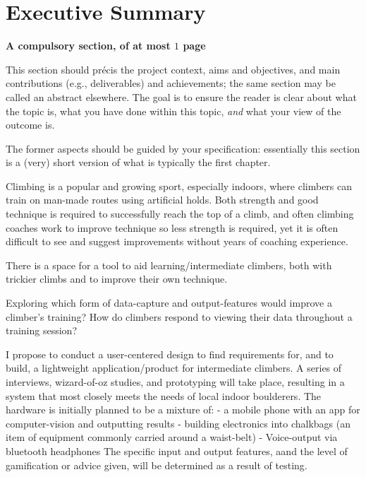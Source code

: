 \chapter*{Executive Summary}

{\bf A compulsory section, of at most $1$ page} 
\vspace{1cm} 

\noindent
This section should pr\'{e}cis the project context, aims and objectives, and main contributions (e.g., deliverables) and achievements; the same section may be called an abstract elsewhere.
The goal is to ensure the reader is clear about what the topic is, what you have done within this topic, {\em and} what your view of the outcome is.

The former aspects should be guided by your specification: essentially this section is a (very) short version of what is typically the first chapter. 



Climbing is a popular and growing sport, especially indoors, where climbers can train on man-made routes using artificial holds.
Both strength and good technique is required to successfully reach the top of a climb, and often climbing coaches work to improve technique so less strength is required, yet it is often difficult to see and suggest improvements without years of coaching experience.

There is a space for a tool to aid learning/intermediate climbers, both with trickier climbs and to improve their own technique.


Exploring which form of data-capture and output-features would improve a climber's training?
How do climbers respond to viewing their data throughout a training session?

I propose to conduct a user-centered design to find requirements for, and to build, a lightweight application/product for intermediate climbers. A series of interviews, wizard-of-oz studies, and prototyping will take place, resulting in a system that most closely meets the needs of local indoor boulderers. The hardware is initially planned to be a mixture of: - a mobile phone with an app for computer-vision and outputting results - building electronics into chalkbags (an item of equipment commonly carried around a waist-belt) - Voice-output via bluetooth headphones The specific input and output features, aand the level of gamification or advice given, will be determined as a result of testing.




